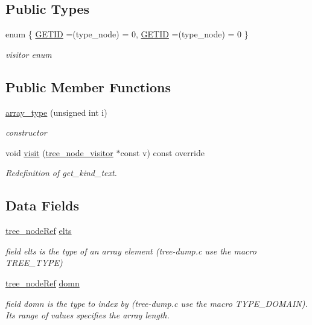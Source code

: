 \subsection*{Public Types}
\begin{DoxyCompactItemize}
\item 
enum \{ \hyperlink{structarray__type_ac099b86ed315428664e8f433ff7f52feafab3f68ae1ee999a6426ba34aa22f73b}{G\+E\+T\+ID} =(type\+\_\+node) = 0, 
\hyperlink{structarray__type_ac099b86ed315428664e8f433ff7f52feafab3f68ae1ee999a6426ba34aa22f73b}{G\+E\+T\+ID} =(type\+\_\+node) = 0
 \}\begin{DoxyCompactList}\small\item\em visitor enum \end{DoxyCompactList}
\end{DoxyCompactItemize}
\subsection*{Public Member Functions}
\begin{DoxyCompactItemize}
\item 
\hyperlink{structarray__type_a79df06bd04131d5f89a8e4d9c240e05b}{array\+\_\+type} (unsigned int i)
\begin{DoxyCompactList}\small\item\em constructor \end{DoxyCompactList}\item 
void \hyperlink{structarray__type_af389e234db3595ab54f93b6656600756}{visit} (\hyperlink{classtree__node__visitor}{tree\+\_\+node\+\_\+visitor} $\ast$const v) const override
\begin{DoxyCompactList}\small\item\em Redefinition of get\+\_\+kind\+\_\+text. \end{DoxyCompactList}\end{DoxyCompactItemize}
\subsection*{Data Fields}
\begin{DoxyCompactItemize}
\item 
\hyperlink{tree__node_8hpp_a6ee377554d1c4871ad66a337eaa67fd5}{tree\+\_\+node\+Ref} \hyperlink{structarray__type_aa7c3522339065eccaa347128ff7fe5b1}{elts}
\begin{DoxyCompactList}\small\item\em field elts is the type of an array element (tree-\/dump.\+c use the macro T\+R\+E\+E\+\_\+\+T\+Y\+PE) \end{DoxyCompactList}\item 
\hyperlink{tree__node_8hpp_a6ee377554d1c4871ad66a337eaa67fd5}{tree\+\_\+node\+Ref} \hyperlink{structarray__type_afda1354e2f6c7eeb435e2c1e12867f71}{domn}
\begin{DoxyCompactList}\small\item\em field domn is the type to index by (tree-\/dump.\+c use the macro T\+Y\+P\+E\+\_\+\+D\+O\+M\+A\+IN). Its range of values specifies the array length. \end{DoxyCompactList}\end{DoxyCompactItemize}
